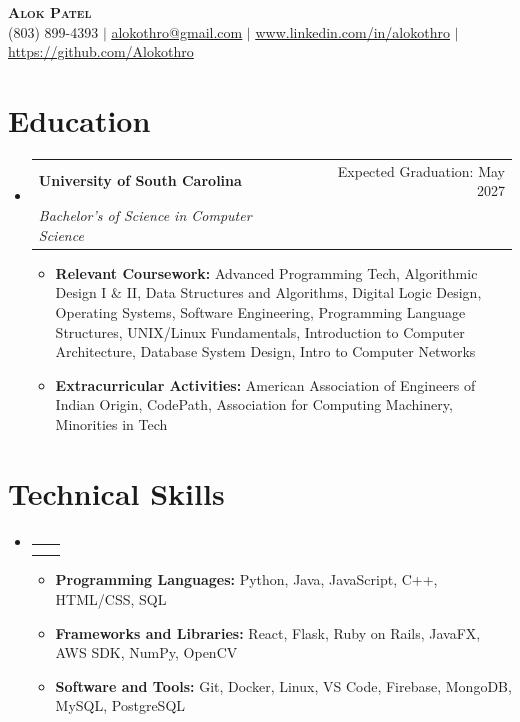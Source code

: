 \documentclass[letterpaper,10.5pt]{article}
\makeatletter
\newcommand{\resumeItem}[1]{
  \item\small{
    {#1 \vspace{-2pt}}
  }
}
\newcommand{\resumeSubheading}[4]{
  \vspace{-2pt}\item
    \begin{tabular*}{0.97\textwidth}[t]{l@{\extracolsep{\fill}}r}
      \textbf{#1} & #2 \\
      \textit{\small#3} & \textit{\small #4} \\
    \end{tabular*}\vspace{-7pt}
}
\newcommand{\resumeSubHeadingListStart}{\begin{itemize}[leftmargin=0.15in, label={}]}
\newcommand{\resumeSubHeadingListEnd}{\end{itemize}}
\newcommand{\resumeItemListStart}{\begin{itemize}}
\newcommand{\resumeItemListEnd}{\end{itemize}\vspace{-5pt}}
\makeatother
\begin{document}
\begin{center}
\vspace{-15pt}
    \textbf{\Huge \scshape Alok Patel} \\
    \vspace{5pt}
    \small (803) 899-4393 $|$ \href{mailto:alokothro@gmail.com}{\underline{alokothro@gmail.com}} $|$
    \href{https://www.linkedin.com/in/alokothro/}{\underline{www.linkedin.com/in/alokothro}}
    $|$
    \href{https://github.com/Alokothro}{\underline{https://github.com/Alokothro}}
\end{center}
\vspace{-10pt}

\section{Education}
  \resumeSubHeadingListStart
    \resumeSubheading
      {University of South Carolina}{Expected Graduation: May 2027}
      {Bachelor's of Science in Computer Science}{}

      \resumeItemListStart
        \resumeItem{\textbf{Relevant Coursework:} Advanced Programming Tech, Algorithmic Design I \& II, Data Structures and Algorithms, Digital Logic Design, Operating Systems, Software Engineering, Programming Language Structures, UNIX/Linux Fundamentals, Introduction to Computer Architecture, Database System Design, Intro to Computer Networks}
        \resumeItem{\textbf{Extracurricular Activities:} American Association of Engineers of Indian Origin, CodePath, Association for Computing Machinery, Minorities in Tech}
      \resumeItemListEnd
  \resumeSubHeadingListEnd
  \vspace{-15pt}

\section{Technical Skills}
    \resumeSubHeadingListStart
        \resumeSubheading
        {}{}{}{}
        \vspace{-28pt}
        \resumeItemListStart
            \resumeItem{\textbf{Programming Languages:} Python, Java, JavaScript, C++, HTML/CSS, SQL}
            \resumeItem{\textbf{Frameworks and Libraries:} React, Flask, Ruby on Rails, JavaFX, AWS SDK, NumPy, OpenCV}
            \resumeItem{\textbf{Software and Tools:} Git, Docker, Linux, VS Code, Firebase, MongoDB, MySQL, PostgreSQL}
        \resumeItemListEnd
    \resumeSubHeadingListEnd
\vspace{-15pt}
\end{document}
